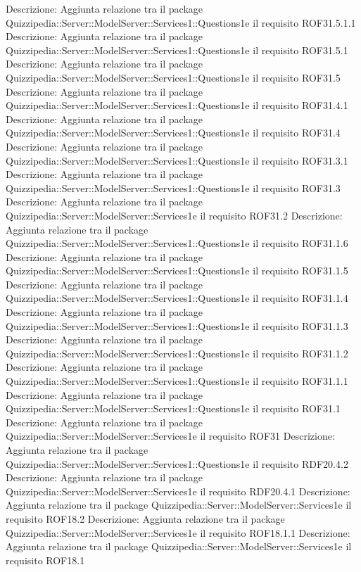 Descrizione: Aggiunta relazione tra il package Quizzipedia::Server::ModelServer::Services1::Questions1e il requisito ROF31.5.1.1 
Descrizione: Aggiunta relazione tra il package Quizzipedia::Server::ModelServer::Services1::Questions1e il requisito ROF31.5.1 
Descrizione: Aggiunta relazione tra il package Quizzipedia::Server::ModelServer::Services1::Questions1e il requisito ROF31.5 
Descrizione: Aggiunta relazione tra il package Quizzipedia::Server::ModelServer::Services1::Questions1e il requisito ROF31.4.1 
Descrizione: Aggiunta relazione tra il package Quizzipedia::Server::ModelServer::Services1::Questions1e il requisito ROF31.4 
Descrizione: Aggiunta relazione tra il package Quizzipedia::Server::ModelServer::Services1::Questions1e il requisito ROF31.3.1 
Descrizione: Aggiunta relazione tra il package Quizzipedia::Server::ModelServer::Services1::Questions1e il requisito ROF31.3 
Descrizione: Aggiunta relazione tra il package Quizzipedia::Server::ModelServer::Services1e il requisito ROF31.2 
Descrizione: Aggiunta relazione tra il package Quizzipedia::Server::ModelServer::Services1::Questions1e il requisito ROF31.1.6 
Descrizione: Aggiunta relazione tra il package Quizzipedia::Server::ModelServer::Services1::Questions1e il requisito ROF31.1.5 
Descrizione: Aggiunta relazione tra il package Quizzipedia::Server::ModelServer::Services1::Questions1e il requisito ROF31.1.4 
Descrizione: Aggiunta relazione tra il package Quizzipedia::Server::ModelServer::Services1::Questions1e il requisito ROF31.1.3 
Descrizione: Aggiunta relazione tra il package Quizzipedia::Server::ModelServer::Services1::Questions1e il requisito ROF31.1.2 
Descrizione: Aggiunta relazione tra il package Quizzipedia::Server::ModelServer::Services1::Questions1e il requisito ROF31.1.1 
Descrizione: Aggiunta relazione tra il package Quizzipedia::Server::ModelServer::Services1::Questions1e il requisito ROF31.1 
Descrizione: Aggiunta relazione tra il package Quizzipedia::Server::ModelServer::Services1e il requisito ROF31 
Descrizione: Aggiunta relazione tra il package Quizzipedia::Server::ModelServer::Services1::Questions1e il requisito RDF20.4.2 
Descrizione: Aggiunta relazione tra il package Quizzipedia::Server::ModelServer::Services1e il requisito RDF20.4.1 
Descrizione: Aggiunta relazione tra il package Quizzipedia::Server::ModelServer::Services1e il requisito ROF18.2 
Descrizione: Aggiunta relazione tra il package Quizzipedia::Server::ModelServer::Services1e il requisito ROF18.1.1 
Descrizione: Aggiunta relazione tra il package Quizzipedia::Server::ModelServer::Services1e il requisito ROF18.1 
